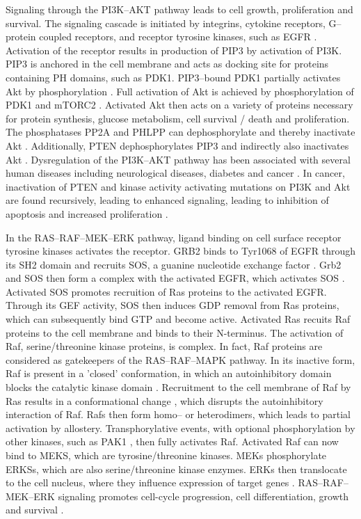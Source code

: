 {{{    Signaling through the PI3K--AKT pathway leads to cell growth, proliferation
    and survival. The signaling cascade is initiated by integrins, cytokine
    receptors, G--protein coupled receptors, and receptor tyrosine kinases, such
    as EGFR {\cite{pi3k_2}}. Activation of the receptor results in production of
    PIP3 by activation of PI3K. PIP3 is anchored in the cell membrane and acts
    as docking site for proteins containing PH domains, such as PDK1.
    PIP3--bound PDK1 partially activates Akt by phosphorylation {\cite{pi3k_3}}.
    Full activation of Akt is achieved by phosphorylation of PDK1 and mTORC2
    {\cite{pdk1}}. Activated Akt then acts on a variety of proteins necessary
    for protein synthesis, glucose metabolism, cell survival / death and
    proliferation. The phosphatases PP2A and PHLPP can dephosphorylate and
    thereby inactivate Akt {\cite{pdk1}}. Additionally, PTEN dephosphorylates
    PIP3 and indirectly also inactivates Akt {\cite{pdk1}}. Dysregulation of the
    PI3K--AKT pathway has been associated with several human diseases including
    neurological diseases, diabetes and cancer {\cite{akt}}. In cancer,
    inactivation of PTEN and kinase activity activating mutations on PI3K and
    Akt are found recursively, leading to enhanced signaling, leading to
    inhibition of apoptosis and increased proliferation {\cite{pi3k}}.

    In the RAS--RAF--MEK--ERK pathway, ligand binding on cell surface receptor
    tyrosine kinases activates the receptor.
    GRB2 binds to Tyr1068 of EGFR through its SH2 domain and recruits SOS, a
    guanine nucleotide exchange factor {\cite{grb2}}. Grb2 and SOS then form a
    complex with the activated EGFR, which activates SOS {\cite{grb2}}.
    Activated SOS promotes recruition of Ras proteins to the activated EGFR.
    Through its GEF activity, SOS then induces GDP removal from Ras proteins,
    which can subsequently bind GTP and become active. Activated Ras recuits Raf
    proteins to the cell membrane and binds to their N-terminus. The activation
    of Raf, serine/threonine kinase proteins, is complex. In fact, Raf proteins
    are considered as gatekeepers of the RAS--RAF--MAPK pathway. In its inactive
    form, Raf is present in a 'closed' conformation, in which an autoinhibitory
    domain blocks the catalytic kinase domain {\cite{raf}}. Recruitment to the
    cell membrane of Raf by Ras results in a conformational change
    {\cite{raf_2}}, which disrupts the autoinhibitory interaction of Raf. Rafs
    then form homo-- or heterodimers, which leads to partial activation by
    allostery. Transphorylative events, with optional phosphorylation by other
    kinases, such as PAK1 {\cite{pak1}}, then fully activates Raf. Activated Raf
    can now bind to MEKS, which are tyrosine/threonine kinases. MEKs
    phosphorylate ERKSs, which are also serine/threonine kinase enzymes. ERKs
    then translocate to the cell nucleus, where they influence expression of
    target genes {\cite{pak1}}. RAS--RAF--MEK--ERK signaling promotes cell-cycle
    progression, cell differentiation, growth and survival {\cite{pak1}}.

}}}
